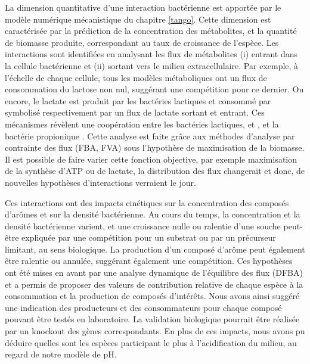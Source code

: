 \documentclass[../main.tex]{subfiles}
\begin{document}
La dimension quantitative d'une interaction bactérienne est apportée par le modèle numérique mécanistique du chapitre \ref{tango}. Cette dimension est caractérisée par la prédiction de la concentration des métabolites, et la quantité de biomasse produite, correspondant au taux de croissance de l'espèce. Les interactions sont identifiées en analysant les flux de métabolites (i) entrant dans la cellule bactérienne et (ii) sortant vers le milieu extracellulaire. Par exemple, à l'échelle de chaque cellule, tous les modèles métaboliques ont un flux de consommation du lactose non nul, suggérant une compétition pour ce dernier. Ou encore, le lactate est produit par les bactéries lactiques et consommé par \freud symbolisé respectivement par un flux de lactate sortant et entrant. Ces mécanismes révèlent une coopération entre les bactéries lactiques, \plantarum et \lactis, et la bactérie propionique \freud. Cette analyse est faite grâce aux méthodes d'analyse par  contrainte des flux (FBA, FVA) \citep{Orth2010, Mahadevan2003}sous l'hypothèse de  maximisation de la biomasse. Il est possible de faire varier cette fonction objective, par exemple maximisation de la synthèse d'ATP ou de lactate, la distribution des flux changerait et donc, de nouvelles hypothèses d'interactions verraient le jour.

Ces interactions ont des impacts cinétiques sur la concentration des composés d'arômes et sur la densité bactérienne. Au cours du temps, la concentration et la densité bactérienne varient, et une croissance nulle ou ralentie d'une souche peut-être expliquée par une compétition pour un substrat ou par un précurseur limitant, au sens biologique. La production d'un composé d'arôme peut également être ralentie ou annulée, suggérant également une compétition. Ces hypothèses ont été mises en avant par une analyse dynamique de l'équilibre des flux (DFBA) \citep{Mahadevan2002} et a permis de proposer des valeurs de contribution relative de chaque espèce à la consommation et la production de composés d'intérêts. Nous avons ainsi suggéré une indication des producteurs et des consommateurs pour chaque composé pouvant être testés en laboratoire. La validation biologique pourrait être réalisée par un knockout des gènes correspondants. En plus de ces impacts, nous avons pu déduire quelles sont les espèces participant le plus à l'acidification du milieu, au regard de notre modèle de pH. \\
\end{document}
